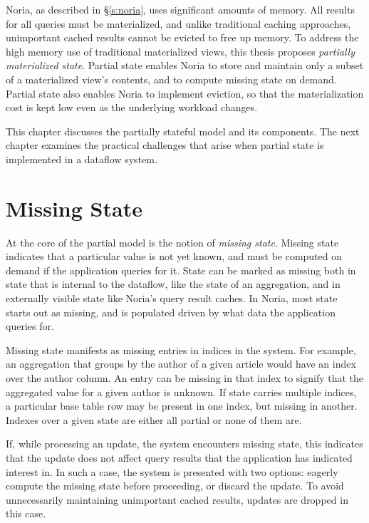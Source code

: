 Noria, as described in \S\ref{s:noria}, uses significant amounts of memory. All
results for all queries must be materialized, and unlike traditional caching
approaches, unimportant cached results cannot be evicted to free up memory. To
address the high memory use of traditional materialized views, this thesis
proposes \textit{partially materialized state}. Partial state enables Noria to
store and maintain only a subset of a materialized view's contents, and to
compute missing state on demand. Partial state also enables Noria to implement
eviction, so that the materialization cost is kept low even as the underlying
workload changes.

This chapter discusses the partially stateful model and its components. The next
chapter examines the practical challenges that arise when partial state is
implemented in a dataflow system.

\section{Missing State}

At the core of the partial model is the notion of \textit{missing state}.
Missing state indicates that a particular value is not yet known, and must be
computed on demand if the application queries for it. State can be marked as
missing both in state that is internal to the dataflow, like the state of an
aggregation, and in externally visible state like Noria's query result caches.
In Noria, most state starts out as missing, and is populated driven by what data
the application queries for.

Missing state manifests as missing entries in indices in the system. For
example, an aggregation that groups by the author of a given article would have
an index over the author column. An entry can be missing in that index to
signify that the aggregated value for a given author is unknown. If state
carries multiple indices, a particular base table row may be present in one
index, but missing in another. Indexes over a given state are either all partial
or none of them are.

If, while processing an update, the system encounters missing state, this
indicates that the update does not affect query results that the application has
indicated interest in. In such a case, the system is presented with two options:
eagerly compute the missing state before proceeding, or discard the update. To
avoid unnecessarily maintaining unimportant cached results, updates are dropped
in this case.

